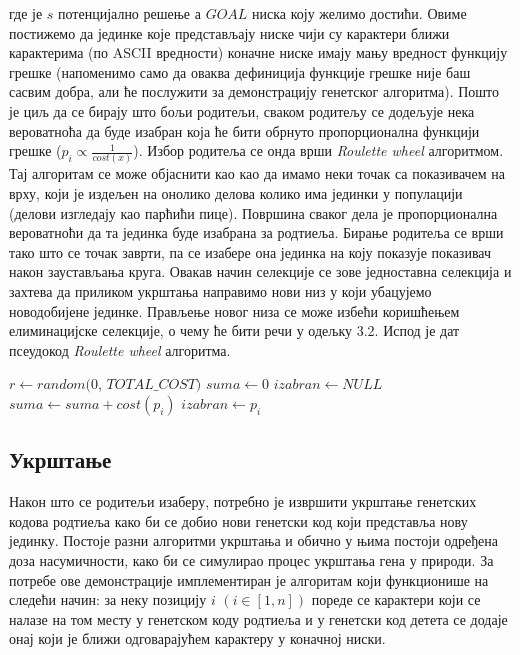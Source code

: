 \documentclass{article}
\begin{document}
где је $s$ потенцијално решење а $GOAL$ ниска коју желимо достићи. Овиме постижемо да 
јединке које представљају ниске чији су карактери ближи карактерима (по ASCII вредности) коначне ниске имају 
мању вредност функцију грешке (напоменимо само да оваква дефиниција функције грешке није 
баш сасвим добра, али ће послужити за демонстрацију генетског алгоритма). Пошто
је циљ да се бирају што бољи родитељи, сваком родитељу се додељује нека вероватноћа да буде изабран
која ће бити обрнуто пропорционална функцији грешке ($p_i \propto \frac{1}{cost(x)}$).
Избор родитеља се онда врши \textit{Roulette wheel} алгоритмом. Тај алгоритам се може објаснити као
као да имамо неки точак са показивачем на врху, који је издељен на онолико делова колико има јединки у популацији
(делови изгледају као парћићи пице). Површина сваког дела је пропорционална вероватноћи да 
та јединка буде изабрана за родтиеља. Бирање родитеља се врши тако што се точак заврти, па 
се изабере она јединка на коју показује показивач након заустављања круга. Овакав начин селекције
се зове једноставна селекција и захтева да приликом укрштања направимо нови низ у који убацујемо
новодобијене јединке. Прављење новог низа се може избећи коришћењем елиминацијске селекције, о чему ће бити
речи у одељку 3.2. Испод је дат псеудокод \textit{Roulette wheel} алгоритма.
\begin{algorithmic}
\State $r \gets random(0$, $TOTAL\_COST)$
\State $suma \gets 0$
\State $izabran \gets NULL$
    \State $suma \gets suma + cost(p_i)$
        \State $izabran \gets p_i$
    \EndIf
\EndFor
\end{algorithmic}


\subsection{Укрштање}
Након што се родитељи изаберу, потребно је извршити укрштање генетских кодова родтиеља
како би се добио нови генетски код који представља нову јединку. Постоје разни алгоритми укрштања
и обично у њима постоји одређена доза насумичности, како би се симулирао процес укрштања гена у природи.
За потребе ове демонстрације имплементиран је алгоритам који функционише на следећи начин: 
за неку позицију $i$ $(i \in [1, n])$ пореде се карактери који се налазе на том месту у генетском коду родтиеља
и у генетски код детета се додаје онај који је ближи одговарајућем карактеру у коначној ниски. 
\end{document}

